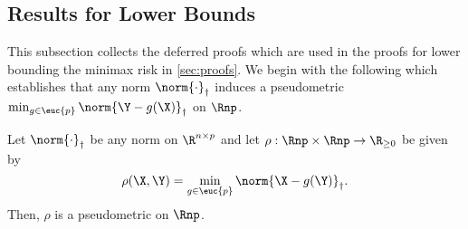 \documentclass[10pt]{article}
\begin{document}
\subsection{Results for Lower Bounds}
\label{sec:lower-bound-results}

This subsection collects the deferred proofs which are used in the proofs for lower bounding the minimax risk in \cref{sec:proofs}. We begin with the following which establishes that any norm $\norm{\cdot}_{\dagger}$ induces a pseudometric $\min_{g \in \euc{p}}\norm{\Y-g(\X)}_{\dagger}$ on $\Rnp$.


\begin{lemma}\label{lem:rho-rigid}
    Let $\norm{\cdot}_\dagger$ be any norm on $\R^{n \times p}$ and let $\rho: \Rnp \times \Rnp \to \R_{\ge 0}$ be given by
    $$
    \rho(\X, \Y) = \min_{g \in \euc{p}}\norm{\X - g(\Y)}_{\dagger}.
    $$
    Then, $\rho$ is a pseudometric on $\Rnp$.
\end{lemma}
\end{document}
